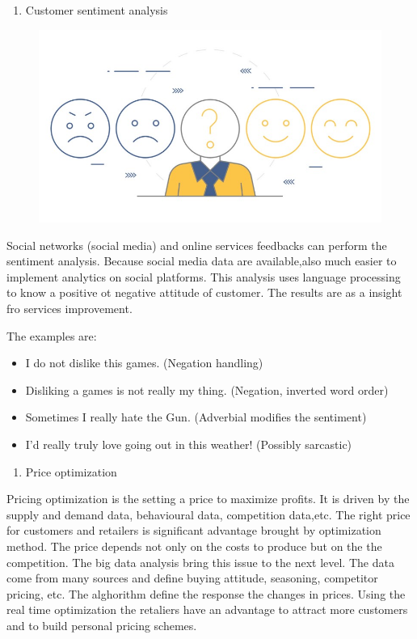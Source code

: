 \documentclass[]{book}
\providecommand{\tightlist}{%
  \setlength{\itemsep}{0pt}\setlength{\parskip}{0pt}}
\begin{document}
\begin{enumerate}
\def\labelenumi{\arabic{enumi}.}
\setcounter{enumi}{8}
\tightlist
\item
  Customer sentiment analysis
\end{enumerate}

\begin{figure}
\centering
\includegraphics{20.jpg}
\caption{}
\end{figure}

Social networks (social media) and online services feedbacks can perform
the sentiment analysis. Because social media data are available,also
much easier to implement analytics on social platforms. This analysis
uses language processing to know a positive ot negative attitude of
customer. The results are as a insight fro services improvement.

The examples are:

\begin{itemize}
\tightlist
\item
  I do not dislike this games. (Negation handling)
\item
  Disliking a games is not really my thing. (Negation, inverted word
  order)
\item
  Sometimes I really hate the Gun. (Adverbial modifies the sentiment)
\item
  I'd really truly love going out in this weather! (Possibly sarcastic)
\end{itemize}

\begin{enumerate}
\def\labelenumi{\arabic{enumi}.}
\setcounter{enumi}{9}
\tightlist
\item
  Price optimization
\end{enumerate}

Pricing optimization is the setting a price to maximize profits. It is
driven by the supply and demand data, behavioural data, competition
data,etc. The right price for customers and retailers is significant
advantage brought by optimization method. The price depends not only on
the costs to produce but on the the competition. The big data analysis
bring this issue to the next level. The data come from many sources and
define buying attitude, seasoning, competitor pricing, etc. The
alghorithm define the response the changes in prices. Using the real
time optimization the retaliers have an advantage to attract more
customers and to build personal pricing schemes.
\end{document}
